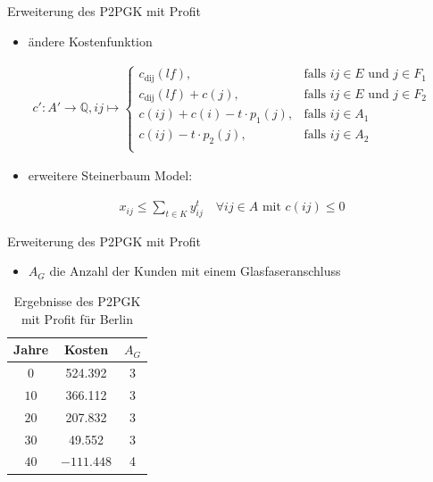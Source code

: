 \documentclass{beamer}
\newcommand{\Q}{\mathbb{Q}}
\begin{document}
		\begin{frame}{Erweiterung des P2PGK mit Profit}
			\begin{itemize}
				\item ändere Kostenfunktion
			\end{itemize}
			\begin{align*}
			c': A' \rightarrow \Q, ij \mapsto \left\{\begin{array}{cl} 
			c_{\text{dij}}(lf), & \text{falls } ij \in E \text{ und } j \in F_1\\ 
			c_{\text{dij}}(lf)+c(j), & \text{falls } ij \in E \text{ und } j \in F_2\\ 
			c(ij) + c(i) - t \cdot p_1(j), & \text{falls } ij \in A_1\\ 
			c(ij) - t \cdot p_2(j), & \text{falls } ij \in A_2\\ 
			\end{array}
			\right.
			\end{align*}
			\begin{itemize}
				\item erweitere Steinerbaum Model:
			\end{itemize}
			\begin{align*}
			x_{ij} \leq \displaystyle\sum_{t \in K} y_{ij}^t \quad \forall ij \in A \text{ mit } c(ij) \leq 0
			\end{align*}
			\end{frame}
		\begin{frame}{Erweiterung des P2PGK mit Profit}
			\begin{itemize}
				\item $A_G$ die Anzahl der Kunden mit einem Glasfaseranschluss
			\end{itemize}

			\begin{table}[h]
				\centering
				\begin{tabular}{c|c|c}
					\centering
					Jahre & Kosten & $A_G$ \\	
					\hline
					$0$   	 &  524.392 & 3  \\
					$10$ 	&   366.112& 3  \\
					$20$   	&   207.832 & 3  \\
					$30$    &   49.552 & 3  \\
					$40$    & $-111.448$ & 4 \\
				\end{tabular}
				\label{P2PGKProfit}
				\caption{Ergebnisse des P2PGK mit Profit f\"ur Berlin} 
			\end{table}
		\end{frame}
		
\end{document}
